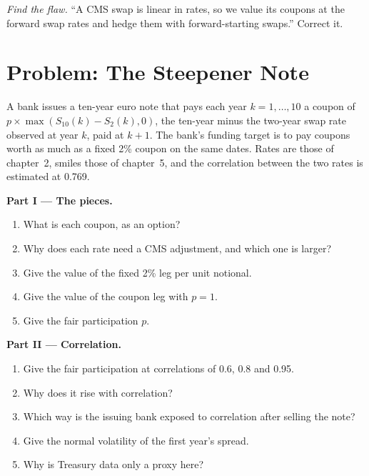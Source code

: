 \begin{exercise}[$\star\star\star$]\label{exo:rc:convexity-adjustments-and-constant-maturity-products:8}
\emph{Find the flaw.} ``A CMS swap is linear in rates, so we value its coupons at
the forward swap rates and hedge them with forward-starting swaps.'' Correct it.
\end{exercise}

\section{Problem: The Steepener Note}

\begin{problem}\label{pb:rc:convexity-adjustments-and-constant-maturity-products:1}
A bank issues a ten-year euro note that pays each year $k=1,\dots,10$ a coupon of
$p\times\max(S_{10}(k)-S_2(k),0)$, the ten-year minus the two-year swap rate
observed at year $k$, paid at $k+1$. The bank's funding target is to pay coupons
worth as much as a fixed 2\% coupon on the same dates. Rates are those of
chapter~2, smiles those of chapter~5, and the correlation between the two rates
is estimated at 0.769.

\medskip\noindent\textbf{Part I --- The pieces.}
\begin{enumerate}
\item What is each coupon, as an option?
\item Why does each rate need a CMS adjustment, and which one is larger?
\item Give the value of the fixed 2\% leg per unit notional.
\item Give the value of the coupon leg with $p=1$.
\item Give the fair participation $p$.
\end{enumerate}

\medskip\noindent\textbf{Part II --- Correlation.}
\begin{enumerate}[resume]
\item Give the fair participation at correlations of 0.6, 0.8 and 0.95.
\item Why does it rise with correlation?
\item Which way is the issuing bank exposed to correlation after selling the note?
\item Give the normal volatility of the first year's spread.
\item Why is Treasury data only a proxy here?
\end{enumerate}


\end{problem}
